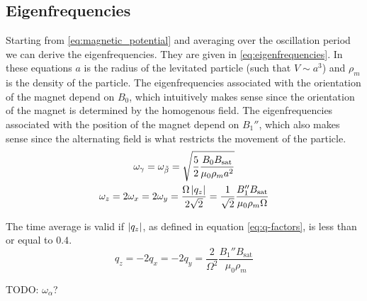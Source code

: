 \subsection{Eigenfrequencies}
\label{subsec:eigenfrequencies}
Starting from \autoref{eq:magnetic_potential} and averaging over the oscillation period we can derive the eigenfrequencies. They are given in \autoref{eq:eigenfrequencies}. In these equations $a$ is the radius of the levitated particle (such that $V \sim a^3$) and $\rho_m$ is the density of the particle. The eigenfrequencies associated with the orientation of the magnet depend on $B_0$, which intuitively makes sense since the orientation of the magnet is determined by the homogenous field. The eigenfrequencies associated with the position of the magnet depend on $B_1''$, which also makes sense since the alternating field is what restricts the movement of the particle.
\begin{equation}
    \begin{gathered}
        \omega_\gamma = \omega_{\tilde\beta} = \sqrt{\frac{5}{2}\frac{B_0B_\text{sat}}{\mu_0 \rho_m a^2}} \\
        \omega_z = 2\omega_x = 2\omega_y = \frac{\Omega \left\lvert q_z\right\rvert}{2\sqrt{2}} = \frac{1}{\sqrt{2}}\frac{B_1''B_\text{sat}}{\mu_0\rho_m\Omega}
    \end{gathered}
    \label{eq:eigenfrequencies}
\end{equation}

The time average is valid if $\left\lvert q_z\right\rvert$, as defined in equation \ref{eq:q-factors}, is less than or equal to $0.4$.
\begin{equation}
    q_z = -2q_x = -2q_y = \frac{2}{\Omega^2}\frac{B_1''B_{\text{sat}}}{\mu_0\rho_m}
    \label{eq:q-factors}
\end{equation}

TODO: $\omega_\alpha$?

